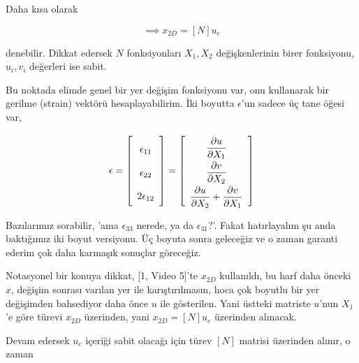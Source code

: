 \documentclass[12pt,fleqn]{article}\usepackage{../../common}
\begin{document}
Daha kısa olarak

$$
\implies x_{2D} = [N] u_e
$$

denebilir. Dikkat edersek $N$ fonksiyonları $X_1,X_2$ değişkenlerinin
birer fonksiyonu, $u_i,v_i$ değerleri ise sabit.

Bu noktada elimde genel bir yer değişim fonksiyonu var, onu kullanarak bir
gerilme (strain) vektörü hesaplayabilirim. İki boyutta $\epsilon$'un sadece üç
tane öğesi var,

$$
\epsilon = \left[\begin{array}{c}
\epsilon_{11} \\ \epsilon_{22} \\ 2 \epsilon_{12} 
\end{array}\right]
\renewcommand*{\arraystretch}{2.0}
= \left[\begin{array}{c}
\dfrac{\partial u}{\partial X_1} \\
\dfrac{\partial v}{\partial X_2} \\
\dfrac{\partial u}{\partial X_2} + \dfrac{\partial v}{\partial X_1} 
\end{array}\right]
$$

Bazılarımız sorabilir, 'ama $\epsilon_{33}$ nerede, ya da $\epsilon_{31}$?'.
Fakat hatırlayalım şu anda baktığımız iki boyut versiyonu. Üç boyuta sonra
geleceğiz ve o zaman garanti ederim çok daha karmaşık sonuçlar göreceğiz. 

Notasyonel bir konuya dikkat, [1, Video 5]'te $x_{2D}$ kullanıldı, bu harf daha
önceki $x$, değişim sonrası varılan yer ile karıştırılmasın, hoca çok boyutlu
bir yer değişimden bahsediyor daha önce $u$ ile gösterilen.  Yani üstteki
matriste $u$'nun $X_1$'e göre türevi $x_{2D}$ üzerinden, yani $x_{2D} = [N] u_e$
üzerinden alınacak.

Devam edersek $u_e$ içeriği sabit olacağı için türev $[N]$ matrisi üzerinden
alınır, o zaman
\end{document}
